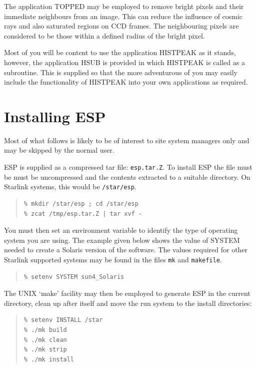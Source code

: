 \documentclass[twoside,11pt]{article}
\newenvironment{myquote}{\begin{quote}\begin{small}}{\end{small}\end{quote}}
\begin{document}
The application TOPPED may be employed to remove bright pixels and their
immediate neighbours from an image. This can reduce the influence of cosmic
rays and also saturated regions on CCD frames. The neighbouring pixels are 
considered to be those within a defined radius of the bright pixel.

Most of you will be content to use the application HISTPEAK as it stands,
however, the application HSUB is provided in which HISTPEAK is called as
a subroutine. This is supplied so that the more adventurous of you may
easily include the functionality of HISTPEAK into your own
applications as required.


\section{Installing ESP}
\label{sec:installing}

Most of what follows is likely to be of interest to site system managers only 
and may be skipped by the normal user.

ESP is supplied as a compressed tar file: {\tt esp.tar.Z}. To install ESP 
the file must be must be uncompressed and the contents extracted to a
suitable directory.  On Starlink systems, this would be {\tt /star/esp}.

\begin{myquote}
\begin{verbatim}
% mkdir /star/esp ; cd /star/esp
% zcat /tmp/esp.tar.Z | tar xvf -
\end{verbatim}
\end{myquote}

You must then set an environment variable to identify the type of
operating system you are using. The example given below shows the value
of SYSTEM needed to create a Solaris version of the software. The values
required for other Starlink supported systems may be found in the files
{\tt mk} and {\tt makefile}.

\begin{myquote}
\begin{verbatim}
% setenv SYSTEM sun4_Solaris
\end{verbatim}
\end{myquote}

The UNIX `make' facility may then be employed to generate ESP in the
current directory, clean up after itself and move the run system to the
install directories:

\begin{myquote}
\begin{verbatim}
% setenv INSTALL /star
% ./mk build
% ./mk clean
% ./mk strip
% ./mk install
\end{verbatim}
\end{myquote}
\end{document}
